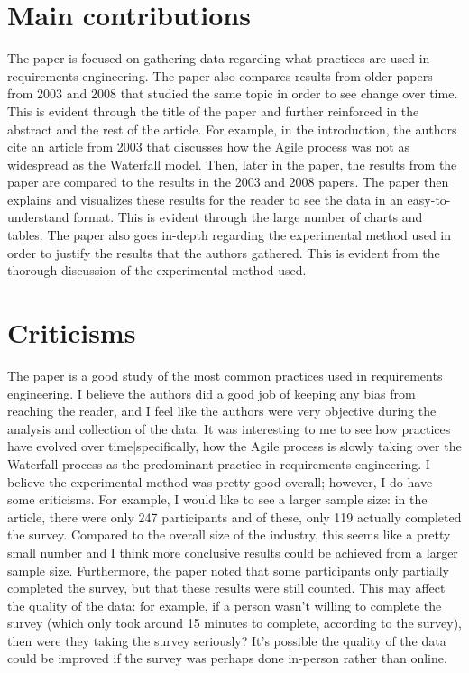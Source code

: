 \documentclass[12pt, letterpaper, titlepage]{article}
\begin{document}
 
\singlespacing

\section{Main contributions}
The paper is focused on gathering data regarding what practices are used in requirements engineering. The paper also compares results from older papers from 2003 and 2008 that studied the same topic in order to see change over time. This is evident through the title of the paper and further reinforced in the abstract and the rest of the article. For example, in the introduction, the authors cite an article from 2003 that discusses how the Agile process was not as widespread as the Waterfall model. Then, later in the paper, the results from the paper are compared to the results in the 2003 and 2008 papers. The paper then explains and visualizes these results for the reader to see the data in an easy-to-understand format. This is evident through the large number of charts and tables. The paper also goes in-depth regarding the experimental method used in order to justify the results that the authors gathered. This is evident from the thorough discussion of the experimental method used.

\section{Criticisms}
The paper is a good study of the most common practices used in requirements engineering. I believe the authors did a good job of keeping any bias from reaching the reader, and I feel like the authors were very objective during the analysis and collection of the data. It was interesting to me to see how practices have evolved over time|specifically, how the Agile process is slowly taking over the Waterfall process as the predominant practice in requirements engineering. I believe the experimental method was pretty good overall; however, I do have some criticisms. For example, I would like to see a larger sample size: in the article, there were only 247 participants and of these, only 119 actually completed the survey. Compared to the overall size of the industry, this seems like a pretty small number and I think more conclusive results could be achieved from a larger sample size. Furthermore, the paper noted that some participants only partially completed the survey, but that these results were still counted. This may affect the quality of the data: for example, if a person wasn't willing to complete the survey (which only took around 15 minutes to complete, according to the survey), then were they taking the survey seriously? It's possible the quality of the data could be improved if the survey was perhaps done in-person rather than online.
\end{document}
